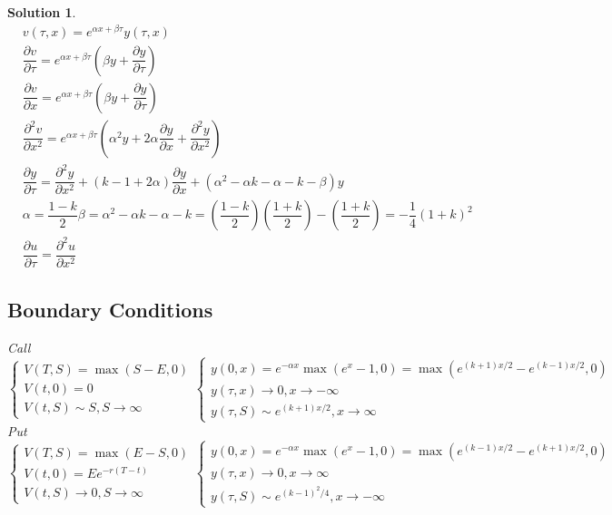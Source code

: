 \documentclass[16pt]{article}
\newtheorem{sol}{Solution}[section]
\begin{document}
\begin{sol}
		\begin{eqnarray*}
		    &v(\tau, x) = e^{\alpha x + \beta \tau} y(\tau, x) \\
			&\dfrac{\partial v}{\partial \tau} = e^{\alpha x + \beta \tau} \left(\beta y  + \dfrac{\partial y}{\partial \tau}\right) \\
			&\dfrac{\partial v}{\partial x} = e^{\alpha x + \beta \tau} \left(\beta y  + \dfrac{\partial y}{\partial \tau}\right) \\
			&\dfrac{\partial^2 v}{\partial x^2} = e^{\alpha x + \beta \tau} \left(\alpha^2 y
			  +  2 \alpha \dfrac{\partial y}{\partial x} + \dfrac{\partial^2 y}{\partial x^2}\right) \\
			&\dfrac{\partial y}{\partial \tau} = \dfrac{\partial^2 y }{\partial x^2} + 
			\left(k -1 + 2\alpha\right)\dfrac{\partial y}{\partial x} +
			\left(\alpha^2 - \alpha k - \alpha  - k  - \beta\right) y \\
			&\alpha = \dfrac{1 - k}{2} 
			\beta =  \alpha^2 - \alpha k - \alpha  - k 	 = \left(\dfrac{1- k}{2}\right)	 \left(\dfrac{1+ k}{2}\right) -  \left(\dfrac{1 + k}{2}\right)	 = -\dfrac{1}{4}(1+k)^2 \\
			&\dfrac{\partial u}{\partial \tau} = \dfrac{\partial^2 u}{\partial x^2}		
		\end{eqnarray*}
	
		\subsection{Boundary Conditions}
		Call
		\begin{equation}
			\begin{cases}
				V(T,S) = \max\left(S - E, 0\right) \\
				V(t,0) = 0 \\
				V(t,S) \sim  S, S \rightarrow \infty
			\end{cases}
			\begin{cases}
				y(0,x) = e^{-\alpha x}\max\left(e^x - 1, 0\right) = \max\left(e^{(k+1)x/2} - e^{(k-1)x/2}, 0\right) \\
				y(\tau,x) \rightarrow 0, x \rightarrow - \infty \\
				y(\tau,S) \sim  e^{(k+1)x/2}, x \rightarrow \infty
			\end{cases}
		\end{equation}
		Put
		\begin{equation}
			\begin{cases}
				V(T,S) = \max\left(E - S, 0\right) \\
				V(t,0) = Ee^{-r(T-t)} \\
				V(t,S)  \rightarrow  0 , S \rightarrow \infty
			\end{cases}
			\begin{cases}
				y(0,x) = e^{-\alpha x}\max\left(e^x - 1, 0\right) = \max\left(e^{(k-1)x/2} - e^{(k+1)x/2}, 0\right) \\
				y(\tau,x) \rightarrow 0, x \rightarrow  \infty \\
				y(\tau,S) \sim  e^{(k-1)^2/4}, x \rightarrow  -\infty
			\end{cases}
		\end{equation}
	
		\end{sol}
\end{document}
